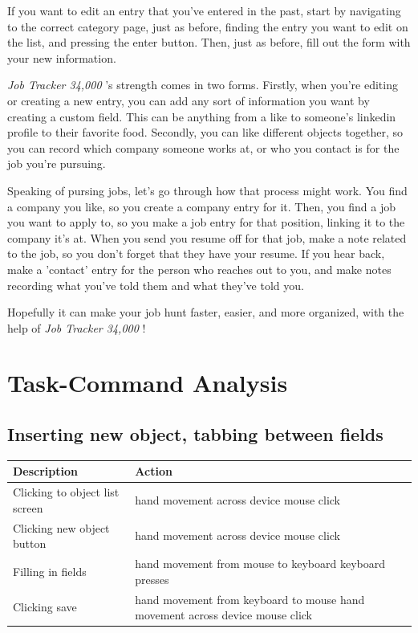 \documentclass[12pt, letter]{article}
\begin{document}
\hfill

If you want to edit an entry that you've entered in the past, start by navigating to the correct category page, just as before, finding the entry you want to edit on the list, and pressing the enter button.  Then, just as before, fill out the form with your new information.

\hfill

\emph{Job Tracker 34,000 \texttrademark \textcopyright}'s strength comes in two forms.  Firstly, when you're editing or creating a new entry, you can add any sort of information you want by creating a custom field.  This can be anything from a like to someone's linkedin profile to their favorite food.  Secondly, you can like different objects together, so you can record which company someone works at, or who you contact is for the job you're pursuing.

\hfill

Speaking of pursing jobs, let's go through how that process might work.  You find a company you like, so you create a company entry for it.  Then, you find a job you want to apply to, so you make a job entry for that position, linking it to the company it's at.  When you send you resume off for that job, make a note related to the job, so you don't forget that they have your resume.  If you hear back, make a 'contact' entry for the person who reaches out to you, and make notes recording what you've told them and what they've told you.

\hfill

Hopefully it can make your job hunt faster, easier, and more organized, with the help of \emph{Job Tracker 34,000 \texttrademark \textcopyright}!


\section{Task-Command Analysis}

\subsection{Inserting new object, tabbing between fields}

\begin{tabular}[H]{|p{5cm} | p{10cm}|}
\hline
Description & Action \\
\hline
Clicking to object list screen & hand movement across device \newline mouse click \\
Clicking new object button & hand movement across device \newline mouse click \\
Filling in fields &  hand movement from mouse to keyboard \newline keyboard presses \\
Clicking save & hand movement from keyboard to mouse \newline hand movement across device \newline mouse click \\
\hline
\end{tabular}
\end{document}
